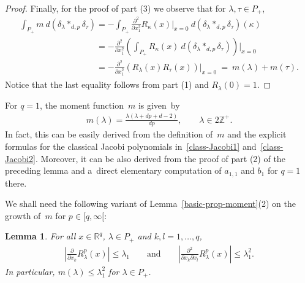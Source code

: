 \documentclass[11pt]{article}
\numberwithin{equation}{section}
\newtheorem{Lemma}[Theorem]{Lemma}
\begin{document}
\begin{proof}
Finally, for the proof of part (3) we observe that for $\lambda,\tau\in P_+$,
\begin{gather*}
\int_{P_+} m\> d(\delta_\lambda*_{d,p}\delta_\tau)
=-\int_{P_+} \frac{\partial^2}{\partial x_1^2}R_\kappa(x)\bigg|_{x=0} \> d(\delta_\lambda*_{d,p}\delta_\tau)(\kappa)
\\
\phantom{\int_{P_+} m\> d(\delta_\lambda*_{d,p}\delta_\tau)}
=-\frac{\partial^2}{\partial x_1^2}\left(\int_{P_+} R_\kappa(x)\>d(\delta_\lambda*_{d,p}\delta_\tau)\right)\bigg|_{x=0}
\\
\phantom{\int_{P_+} m\> d(\delta_\lambda*_{d,p}\delta_\tau)}
=-\frac{\partial^2}{\partial x_1^2}\left(R_\lambda(x)R_\tau(x)\right)\bigg|_{x=0} \>=\> m(\lambda)+m(\tau).
\end{gather*}
Notice that the last equality follows from part (1) and $R_\lambda(0)=1$.
\end{proof}

\begin{Example}
 For $q=1$, the moment function~$m$ is given~by
\begin{gather*}
m(\lambda)= \frac{\lambda(\lambda+dp+d-2)}{dp},
\qquad
\lambda\in 2\mathbb Z^+.
\end{gather*}
In fact, this can be easily derived from the def\/inition of~$m$ and the explicit formulas for the classical Jacobi
polynomials in~\eqref{class-Jacobi1} and~\eqref{class-Jacobi2}.
Moreover, it can be also derived from the proof of part (2) of the preceding lemma and a~direct elementary computation
of $a_{1,1}$ and $b_1$ for $q=1$ there.
\end{Example}

We shall need the following variant of Lemma~\ref{basic-prop-moment}(2) on the growth of~$m$ for $p\in[q,\infty[$:

\begin{Lemma}
\label{quad-wachstum-oben}
For all $x\in\mathbb R^q$, $\lambda\in P_+$ and $k,l=1,\ldots,q$,
\begin{gather*}
\left|\frac{\partial}{\partial x_k} R_\lambda^p(x)\right|\leq \lambda_1
\qquad
\text{and}
\qquad
\left|\frac{\partial^2}{\partial x_k\partial x_l} R_\lambda^p(x)\right|\leq \lambda_1^2.
\end{gather*}
In particular, $m(\lambda)\leq \lambda_1^2$ for $\lambda\in P_+$.
\end{Lemma}
\end{document}
